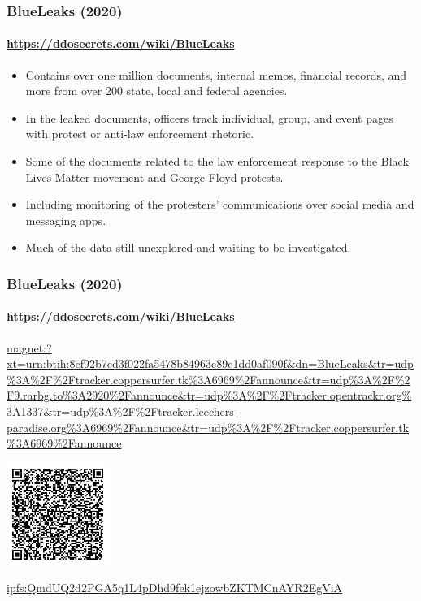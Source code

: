 \documentclass[aspectratio=169,usenames,dvipsnames]{beamer}
\begin{document}
\begin{frame}
  \frametitle{BlueLeaks (2020)}
  \framesubtitle{\url{https://ddosecrets.com/wiki/BlueLeaks}}

  \begin{itemize}[<+->]
    \item Contains over one million documents, internal memos,
      financial records, and more from over 200 state, local and federal
      agencies.
    \item In the leaked documents, officers track individual, group, and event
      pages with protest or anti-law enforcement rhetoric.
    \item Some of the documents related to the law enforcement response to the
      Black Lives Matter movement and George Floyd protests.
    \item Including monitoring of the protesters' communications over social
      media and messaging apps.
    \item Much of the data still unexplored and waiting to be investigated.
  \end{itemize}

\end{frame}

\begin{frame}[c]
  \frametitle{BlueLeaks (2020)}
  \framesubtitle{\url{https://ddosecrets.com/wiki/BlueLeaks}}

  \centering

  \scriptsize

  \url{magnet:?xt=urn:btih:8cf92b7cd3f022fa5478b84963e89c1dd0af090f&dn=BlueLeaks&tr=udp\%3A\%2F\%2Ftracker.coppersurfer.tk\%3A6969\%2Fannounce&tr=udp\%3A\%2F\%2F9.rarbg.to\%3A2920\%2Fannounce&tr=udp\%3A\%2F\%2Ftracker.opentrackr.org\%3A1337&tr=udp\%3A\%2F\%2Ftracker.leechers-paradise.org\%3A6969\%2Fannounce&tr=udp\%3A\%2F\%2Ftracker.coppersurfer.tk\%3A6969\%2Fannounce}

  \includegraphics[width=0.25\textwidth,height=0.25\textwidth,keepaspectratio]{img/blueleaks_qr.png}

  \normalsize

  \url{ipfs:QmdUQ2d2PGA5q1L4pDhd9fek1ejzowbZKTMCnAYR2EgViA}

\end{frame}
\end{document}
